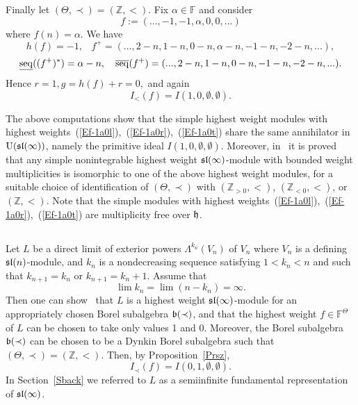 \documentclass[10pt]{amsart}\oddsidemargin -1mm \evensidemargin -1mm \topmargin -15mm\headheight5mm \headsep 3.5mm \textheight 245mm\textwidth 170mm
\theoremstyle{definition}\newtheorem{theorem}{Theorem}[section]\newtheorem{lemma}[theorem]{Lemma}\newtheorem{remark}[theorem]{Remark}\newtheorem{proposition}[theorem]{Proposition}\newtheorem{corollary}[theorem]{Corollary}\newtheorem{definition}[theorem]{Definition}\newtheorem{Ex}[theorem]{Example}\newtheorem{obs}[theorem]{Observation}\newtheorem{nota}[theorem]{Notation}
\begin{document}
Finally let $(\Theta, \prec)=(\mathbb Z, <)$. Fix $\alpha\in\mathbb F$ and consider
\begin{equation}f:=(..., -1, -1, \alpha, 0, 0,...)\label{Ef-1a0t}\end{equation}
where $f(n)=\alpha$. 
We have
$$h(f)=-1,\hspace{10pt} f^+=(..., 2-n, 1-n, 0-n, \alpha-n, -1-n, -2-n,...),$$
$${\rm\underline{seq}}((f^+)^*)= \alpha-n,\hspace{10pt}{\rm\overline{seq}}(f^+)=(..., 2-n, 1-n, 0-n, -1-n, -2-n, ...).$$
Hence $r=1, g=h(f)+r=0,$ and again $$I_<(f)=I(1, 0, \emptyset, \emptyset).$$

The above computations show that the simple highest weight modules with highest weights~(\ref{Ef-1a0l}),~(\ref{Ef-1a0r}),~(\ref{Ef-1a0t}) share the same annihilator in ${\rm U}(\frak{sl}(\infty))$, namely the primitive ideal $I(1, 0, \emptyset, \emptyset)$. 
Moreover, in~\cite{GP} it is proved that any simple nonintegrable highest weight $\frak{sl}(\infty)$-module with bounded weight multiplicities is isomorphic to one of the above highest weight modules, for a suitable choice of identification of $(\Theta, \prec)$ with $(\mathbb{Z}_{>0}, <)$, $(\mathbb{Z}_{<0}, <)$, or $(\mathbb{Z}, <)$.
Note that the simple modules with highest weights~(\ref{Ef-1a0l}),~(\ref{Ef-1a0r}),~(\ref{Ef-1a0t}) are multiplicity free over $\frak h$. 
\subsection{}
Let $L$ be a direct limit of exterior powers $\Lambda^{k_n}(V_n)$ of $V_n$ where $V_n$ is a defining $\frak{sl}(n)$-module, and $k_n$ is a nondecreasing sequence satisfying $1< k_n<n$ and such that $k_{n+1}=k_n$ or $k_{n+1}=k_n+1$.
Assume that $$\lim k_n=\lim(n-k_n)=\infty.$$
Then one can show~\cite{GP} that $L$ is a highest weight $\frak{sl}(\infty)$-module for an appropriately chosen Borel subalgebra $\frak b(\prec)$, and that the highest weight $f\in\mathbb F^\Theta$ of $L$ can be chosen to take only values 1 and 0. 
Moreover, the Borel subalgebra $\frak b(\prec)$ can be chosen to be a Dynkin Borel subalgebra such that $(\Theta, \prec)=(\mathbb Z, <)$. 
Then, by Proposition~\ref{Prsz}, $$I_\prec(f)=I(0, 1, \emptyset, \emptyset).$$ 
In Section~\ref{Sback} we referred to $L$ as a semiinfinite fundamental representation of $\frak{sl}(\infty)$.  
\end{document}
